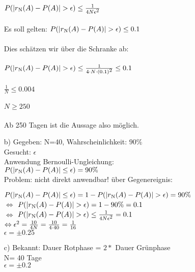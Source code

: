 \documentclass[a4paper]{article}
\begin{document}
\begin{description}
\begin{itemize}
		$P(\left|r\textsubscript{N}(A)-P(A)\right|>\epsilon) \leq \frac{1}{4N\epsilon\textsuperscript{2}}$\\
		\\
		Es soll gelten:
		$P(\left|r\textsubscript{N}(A)-P(A)\right|>\epsilon) \leq 0.1$ \\
		\\
		Dies schätzen wir über die Schranke ab:\\
		\\
		$P(\left|r\textsubscript{N}(A)-P(A)\right|>\epsilon) \leq \frac{1}{4\cdot N\cdot (0.1)\textsuperscript{2}} \leq 0.1$\\		\\
		$\frac{1}{N} \leq 0.004$\\
		\\
		$N \geq 250$\\
		\\
		Ab 250 Tagen ist die Aussage also möglich.\\
											
	\item[b)] Gegeben: N=40, Wahrscheinlichkeit: $90\%$ \\

		Gesucht: $\epsilon$\\
		
		Anwendung Bernoulli-Ungleichung:\\
		$P(\left|r\textsubscript{N}(A)-P(A)\right|\leq \epsilon)= 90\%$\\
		
		Problem: nicht direkt anwendbar!
		über Gegenereignis:
		
		$P(\left|r\textsubscript{N}(A)-P(A)\right|\leq \epsilon)=1-P(\left|r\textsubscript{N}(A)-P(A)\right|> \epsilon)=90\%$\\
		
		$\Leftrightarrow$ $P(\left|r\textsubscript{N}(A)-P(A)\right|> \epsilon)=1-90\% = 0.1$\\
		
		$\Leftrightarrow$ $P(\left|r\textsubscript{N}(A)-P(A)\right|> \epsilon) \leq \frac{1}{4N\epsilon\textsuperscript{2}} = 0.1$\\
		
		$\Leftrightarrow \epsilon\textsuperscript{2}= \frac{10}{4N}= \frac{10}{4\cdot40}=\frac{1}{16}$\\
		
		$\epsilon = \pm 0.25$\\
		
  \item[c)]	Bekannt: Dauer Rotphase = $2 *$ Dauer Grünphase\\
		N= 40 Tage\\
		$\epsilon= \pm 0.2$\\
		

\end{itemize}
\end{description}
\end{document}
